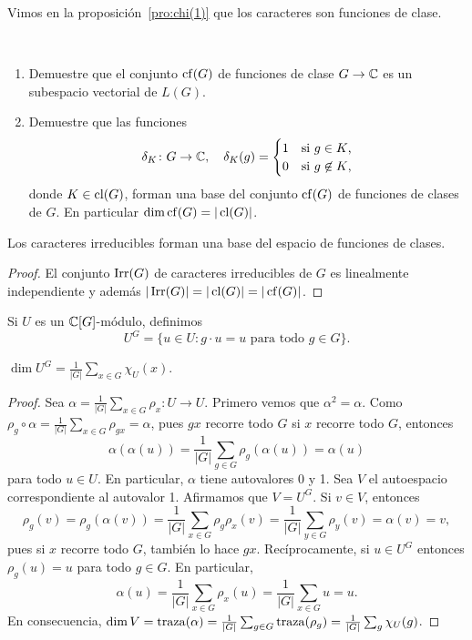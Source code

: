 Vimos en la proposición~\ref{pro:chi(1)} que los caracteres son funciones de
clase. 

\begin{exercise}\
    \begin{enumerate}
      \item Demuestre que el conjunto $\operatorname{cf}(G)$ de funciones de clase $G\to\mathbb{C}$
	es un subespacio vectorial de $L(G)$. 
      \item Demuestre que las funciones
	\[
	  \delta_K\colon G\to\mathbb{C},\quad
	  \delta_K(g)=\begin{cases}
	    1 & \text{si $g\in K$,}\\
	    0 & \text{si $g\not\in K$,}
	  \end{cases}
	\]
	donde $K\in\operatorname{cl}(G)$, forman una base del conjunto $\operatorname{cf}(G)$ de funciones de clases de 
	$G$. En particular $\dim\operatorname{cf}(G)=|\operatorname{cl}(G)|$.
	\end{enumerate}
\end{exercise}

\begin{proposition}
    Los caracteres irreducibles forman una base del espacio de funciones de clases.
\end{proposition}

\begin{proof}
    El conjunto $\operatorname{Irr}(G)$ de caracteres irreducibles de $G$ es linealmente independiente y además 
    $|\operatorname{Irr}(G)|=|\operatorname{cl}(G)|=|\operatorname{cf}(G)|$.
\end{proof}

Si $U$ es un $\mathbb{C}[G]$-módulo, definimos
\[
U^G=\{u\in U:g\cdot u=u\text{ para todo $g\in G$}\}.
\]

\begin{lemma}
\label{lem:invariantes}
  $\dim U^G=\frac{1}{|G|}\sum_{x\in G}\chi_U(x)$. 
\end{lemma}

\begin{proof}
  Sea $\alpha=\frac{1}{|G|}\sum_{x\in G}\rho_x\colon U\to U$. 
  Primero vemos que $\alpha^2=\alpha$. 
  Como $\rho_g\circ \alpha=\frac{1}{|G|}\sum_{x\in G}\rho_{gx}=\alpha$, pues  
  $gx$ recorre todo $G$ si $x$ recorre todo $G$, entonces
  \[
  \alpha(\alpha(u))=\frac{1}{|G|}\sum_{g\in G}\rho_g(\alpha(u))=\alpha(u) 
  \]
  para todo $u\in U$. En particular, $\alpha$ tiene autovalores 0 y 1. Sea $V$ 
  el autoespacio correspondiente al autovalor 1. 
  Afirmamos que $V=U^G$. Si $v\in V$, entonces
  \[
  \rho_g(v)=\rho_g(\alpha(v))=\frac{1}{|G|}\sum_{x\in G}\rho_g\rho_x(v)=\frac{1}{|G|}\sum_{y\in G}\rho_y(v)=\alpha(v)=v,
  \]
  pues si $x$ recorre todo $G$, también lo hace $gx$. 
  Recíprocamente, si $u\in U^G$ entonces
  $\rho_g(u)=u$ para todo $g\in G$. En particular, 
  \[
  \alpha(u)=\frac{1}{|G|}\sum_{x\in G}\rho_x(u)=\frac{1}{|G|}\sum_{x\in G}u=u.
  \]
  En consecuencia, 
  $\dim V=\operatorname{traza}(\alpha)=\frac{1}{|G|}\sum_{g\in G}\operatorname{traza}(\rho_g)=\frac{1}{|G|}\sum_{g}\chi_U(g)$.
\end{proof}

